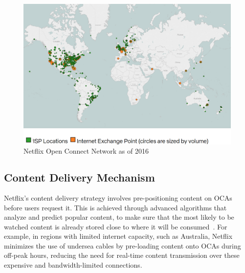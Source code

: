 \begin{figure}[htpb]
    \centering
    \includegraphics[width=\linewidth]{images/NetflixISP.png}
    \caption[Netflix Open Connect Network as of 2016]{Netflix Open Connect Network as of 2016~\parencite{netflix_open_connect}}\label{fig:netflix-isp}
\end{figure}

\subsection{Content Delivery Mechanism}

Netflix's content delivery strategy involves pre-positioning content on \ac{OCAs} before users request it. This is achieved through advanced algorithms that analyze and predict popular content, to make sure that the most likely to be watched content is already stored close to where it will be consumed~\parencite{netflix_cloud}. For example, in regions with limited internet capacity, such as Australia, Netflix minimizes the use of undersea cables by pre-loading content onto \ac{OCAs} during off-peak hours, reducing the need for real-time content transmission over these expensive and bandwidth-limited connections.


